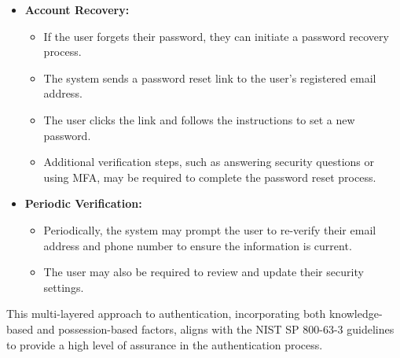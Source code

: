 \documentclass{article}
\begin{document}
\begin{itemize}
                        \item \textbf{Account Recovery:}
                        \begin{itemize}
                            \item If the user forgets their password, they can initiate a password recovery process.
                            \item The system sends a password reset link to the user's registered email address.
                            \item The user clicks the link and follows the instructions to set a new password.
                            \item Additional verification steps, such as answering security questions or using MFA, may be required to complete the password reset process.
                        \end{itemize}
                        
                        \item \textbf{Periodic Verification:}
                        \begin{itemize}
                            \item Periodically, the system may prompt the user to re-verify their email address and phone number to ensure the information is current.
                            \item The user may also be required to review and update their security settings.
                        \end{itemize}
                    \end{itemize}
                    
                    This multi-layered approach to authentication, incorporating both knowledge-based and possession-based factors, aligns with the NIST SP 800-63-3 guidelines to provide a high level of assurance in the authentication process.
\end{document}

